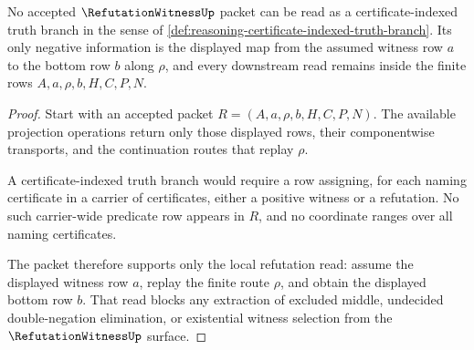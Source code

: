 \begin{theorem}
\label{thm:refutation-witness-truth-branch-blocker}
No accepted $\RefutationWitnessUp$ packet can be read as a certificate-indexed truth branch in the sense of \autoref{def:reasoning-certificate-indexed-truth-branch}. Its only negative information is the displayed map from the assumed witness row $a$ to the bottom row $b$ along $\rho$, and every downstream read remains inside the finite rows $A,a,\rho,b,H,C,P,N$.
\end{theorem}
\begin{proof}
Start with an accepted packet $R=(A,a,\rho,b,H,C,P,N)$. The available projection operations return only those displayed rows, their componentwise transports, and the continuation routes that replay $\rho$.

A certificate-indexed truth branch would require a row assigning, for each naming certificate in a carrier of certificates, either a positive witness or a refutation. No such carrier-wide predicate row appears in $R$, and no coordinate ranges over all naming certificates.

The packet therefore supports only the local refutation read: assume the displayed witness row $a$, replay the finite route $\rho$, and obtain the displayed bottom row $b$. That read blocks any extraction of excluded middle, undecided double-negation elimination, or existential witness selection from the $\RefutationWitnessUp$ surface.
\end{proof}

